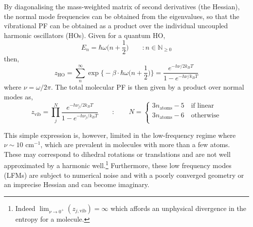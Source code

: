 \documentclass[../main.tex]{subfiles}
\begin{document}
By diagonalising the mass-weighted matrix of second derivatives (the Hessian), the normal mode frequencies can be obtained from the eigenvalues, so that the vibrational PF can be obtained as a product over the individual uncoupled harmonic oscillators (HOs). Given for a quantum HO,
\begin{equation}
E_n = \hbar\omega {\Big (} n + \frac{1}{2} {\Big )} \qquad : n \in \mathbb{N}_{\ge 0}
\end{equation}
then,
\begin{equation}
	z_\text{HO} = \sum_{n}^\infty \exp {\Big \{} -{\beta}\cdot  \hbar\omega {\Big (} n + \frac{1}{2} {\Big )} {\Big \}}  = \frac{e^{-h\nu / 2 k_B T}}{1 - e^{-h\nu / k_B T} }
\end{equation}
where $\nu = \omega / 2\pi$. The total molecular PF is then given by a product over normal modes as,
\begin{equation}
z_\text{vib} = \prod_j^{N} \frac{e^{-h\nu_j / 2 k_B T}}{1 - e^{-h\nu_j / k_B T} } \qquad : \qquad  N = \begin{cases}
	3 n_\text{atoms} - 5 \quad\text{if linear} \\
	3 n_\text{atoms} - 6 \quad\text{otherwise} \\
 \end{cases}
\label{z_ho}
\end{equation}

This simple expression is, however, limited in the low-frequency regime where $\nu \sim 10 \text{ cm}^{-1}$, which are prevalent in molecules with more than a few atoms. These may correspond to dihedral rotations or translations and are not well approximated by a harmonic well.\footnote{Indeed $\lim_{\nu \rightarrow 0^+} (z_{j, \text{vib}})= \infty$ which affords an unphysical divergence in the entropy for a molecule.} Furthermore, these low frequency modes (LFMs) are subject to numerical noise and with a poorly converged geometry or an imprecise Hessian and can become imaginary.
\end{document}
